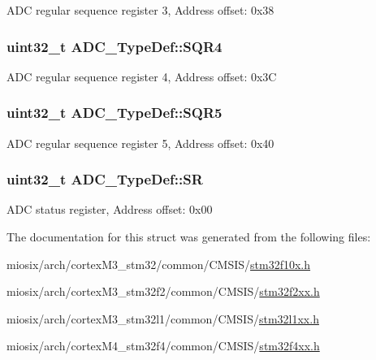 A\-D\-C regular sequence register 3, Address offset\-: 0x38 \hypertarget{struct_a_d_c___type_def_ab66c9816c1ca151a6ec728ec55655264}{
\subsubsection[{S\-Q\-R4}]{ uint32\-\_\-t A\-D\-C\-\_\-\-Type\-Def\-::\-S\-Q\-R4}}\label{struct_a_d_c___type_def_ab66c9816c1ca151a6ec728ec55655264}
A\-D\-C regular sequence register 4, Address offset\-: 0x3\-C \hypertarget{struct_a_d_c___type_def_a9cc66bea4b86f1312a7b34f931c3895a}{
\subsubsection[{S\-Q\-R5}]{ uint32\-\_\-t A\-D\-C\-\_\-\-Type\-Def\-::\-S\-Q\-R5}}\label{struct_a_d_c___type_def_a9cc66bea4b86f1312a7b34f931c3895a}
A\-D\-C regular sequence register 5, Address offset\-: 0x40 \hypertarget{struct_a_d_c___type_def_a9745df96e98f3cdc2d05ccefce681f64}{
\subsubsection[{S\-R}]{ uint32\-\_\-t A\-D\-C\-\_\-\-Type\-Def\-::\-S\-R}}\label{struct_a_d_c___type_def_a9745df96e98f3cdc2d05ccefce681f64}
A\-D\-C status register, Address offset\-: 0x00 

The documentation for this struct was generated from the following files\-:\begin{DoxyCompactItemize}
\item 
miosix/arch/cortex\-M3\-\_\-stm32/common/\-C\-M\-S\-I\-S/\hyperlink{stm32f10x_8h}{stm32f10x.\-h}\item 
miosix/arch/cortex\-M3\-\_\-stm32f2/common/\-C\-M\-S\-I\-S/\hyperlink{stm32f2xx_8h}{stm32f2xx.\-h}\item 
miosix/arch/cortex\-M3\-\_\-stm32l1/common/\-C\-M\-S\-I\-S/\hyperlink{stm32l1xx_8h}{stm32l1xx.\-h}\item 
miosix/arch/cortex\-M4\-\_\-stm32f4/common/\-C\-M\-S\-I\-S/\hyperlink{stm32f4xx_8h}{stm32f4xx.\-h}\end{DoxyCompactItemize}
